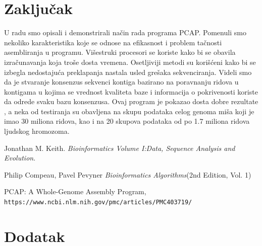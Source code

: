 \documentclass[a4paper]{article}
\begin{document}
{\section{Zaključak}
\label{sec:zakljucak}
 U radu smo opisali i demonstrirali način rada programa PCAP. Pomenuli smo nekoliko karakteristika koje se odnose na efikasnost i problem tačnosti asembliranja u programu. Višestruki procesori se koriste kako bi se obavila izračunavanja koja troše dosta vremena. Osetljiviji metodi su korišćeni kako bi se izbegla nedostajuća preklapanja nastala usled grešaka sekvenciranja. Videli smo da je stvaranje konsenzus sekvenci kontiga bazirano na poravnanju ridova u kontigama u kojima se vrednost kvaliteta baze i informacija o pokrivenosti koriste da odrede svaku bazu konsenzusa. Ovaj program je pokazao dosta dobre rezultate , a neka od testiranja su obavljena na skupu podataka celog genoma miša koji je imao 30 miliona ridova, kao i na 20 skupova podataka od po 1.7 miliona ridova ljudskog hromozoma.  


\appendix
 

\begin{thebibliography}{9}
Jonathan M. Keith. 
\textit{Bioinformatics Volume I:Data, Sequence Analysis and Evolution}. 
 
Philip Compeau, Pavel Pevyner 
\textit{Bioinformatics Algorithms}(2nd Edition, Vol. 1) 

 
PCAP: A Whole-Genome Assembly Program,
\\\texttt{https://www.ncbi.nlm.nih.gov/pmc/articles/PMC403719/}
\end{thebibliography}


\appendix
\section{Dodatak}
\label{sec:dodatak}
}
\end{document}
